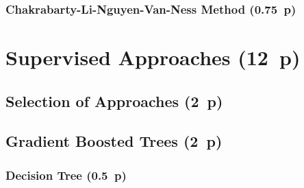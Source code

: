 


\subsubsection{Chakrabarty-Li-Nguyen-Van-Ness
  Method (0.75~p)}\label{sec:chakarabarty-li-nguyen-van-ness-method}

\newpage
\section{Supervised Approaches (12~p)}\label{sec:supervised-approaches}

\subsection{Selection of Approaches (2~p)}\label{sec:selection-of-approaches}

\subsection{Gradient Boosted Trees (2~p)}\label{sec:gradient-boosted-trees}

\subsubsection{Decision Tree (0.5~p)}\label{sec:decision-tree}


